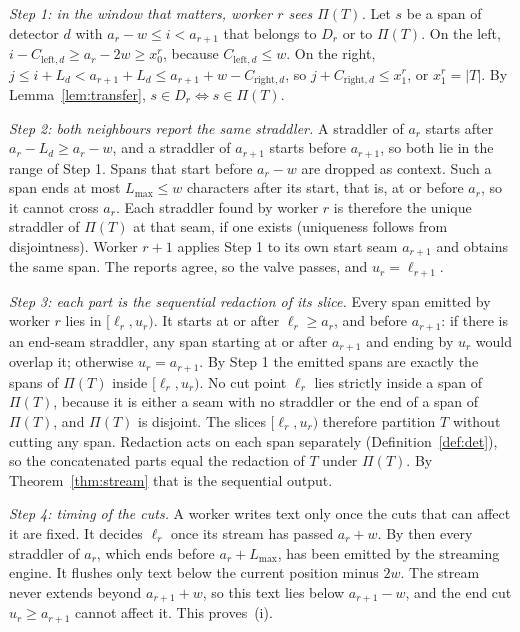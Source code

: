 \documentclass[pdflatex,sn-mathphys-num]{sn-jnl}
\theoremstyle{\ssThmStyle}
\theoremstyle{\ssDefStyle}
\begin{document}
\emph{Step 1: in the window that matters, worker $r$ sees $\Pi(T)$.} Let $s$ be a span of detector $d$ with $a_r - w \le i < a_{r+1}$ that belongs to $D_r$ or to $\Pi(T)$. On the left, $i - C_{\mathrm{left},d} \ge a_r - 2w \ge x_0^{r}$, because $C_{\mathrm{left},d} \le w$. On the right, $j \le i + L_d < a_{r+1} + L_d \le a_{r+1} + w - C_{\mathrm{right},d}$, so $j + C_{\mathrm{right},d} \le x_1^{r}$, or $x_1^{r} = |T|$. By Lemma~\ref{lem:transfer}, $s \in D_r \Leftrightarrow s \in \Pi(T)$.

\emph{Step 2: both neighbours report the same straddler.} A straddler of $a_r$ starts after $a_r - L_d \ge a_r - w$, and a straddler of $a_{r+1}$ starts before $a_{r+1}$, so both lie in the range of Step 1. Spans that start before $a_r - w$ are dropped as context. Such a span ends at most $L_{\max} \le w$ characters after its start, that is, at or before $a_r$, so it cannot cross $a_r$. Each straddler found by worker $r$ is therefore the unique straddler of $\Pi(T)$ at that seam, if one exists (uniqueness follows from disjointness). Worker $r+1$ applies Step 1 to its own start seam $a_{r+1}$ and obtains the same span. The reports agree, so the valve passes, and $u_r = \ell_{r+1}$.

\emph{Step 3: each part is the sequential redaction of its slice.} Every span emitted by worker $r$ lies in $[\ell_r, u_r)$. It starts at or after $\ell_r \ge a_r$, and before $a_{r+1}$: if there is an end-seam straddler, any span starting at or after $a_{r+1}$ and ending by $u_r$ would overlap it; otherwise $u_r = a_{r+1}$. By Step 1 the emitted spans are exactly the spans of $\Pi(T)$ inside $[\ell_r, u_r)$. No cut point $\ell_r$ lies strictly inside a span of $\Pi(T)$, because it is either a seam with no straddler or the end of a span of $\Pi(T)$, and $\Pi(T)$ is disjoint. The slices $[\ell_r, u_r)$ therefore partition $T$ without cutting any span. Redaction acts on each span separately (Definition~\ref{def:det}), so the concatenated parts equal the redaction of $T$ under $\Pi(T)$. By Theorem~\ref{thm:stream} that is the sequential output.

\emph{Step 4: timing of the cuts.} A worker writes text only once the cuts that can affect it are fixed. It decides $\ell_r$ once its stream has passed $a_r + w$. By then every straddler of $a_r$, which ends before $a_r + L_{\max}$, has been emitted by the streaming engine. It flushes only text below the current position minus $2w$. The stream never extends beyond $a_{r+1} + w$, so this text lies below $a_{r+1} - w$, and the end cut $u_r \ge a_{r+1}$ cannot affect it. This proves~(i).
\end{document}

